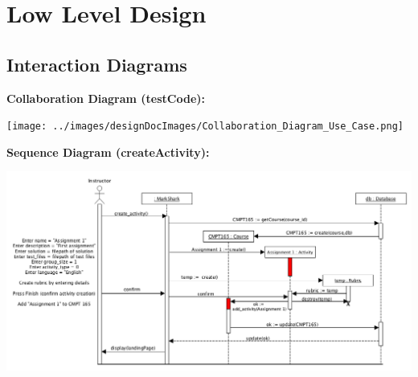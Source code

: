 \documentclass{article}
\begin{document}
\section{Low Level Design}
\subsection{Interaction Diagrams}
\textbf{Collaboration Diagram (testCode):}\\
\centerline{\texttt{[image: ../images/designDocImages/Collaboration\_Diagram\_Use\_Case.png]}}
\clearpage
\textbf{Sequence Diagram (createActivity):}\\
\centerline{\includegraphics[scale=0.55]{../images/designDocImages/sequenceDiag.png}}
\end{document}
